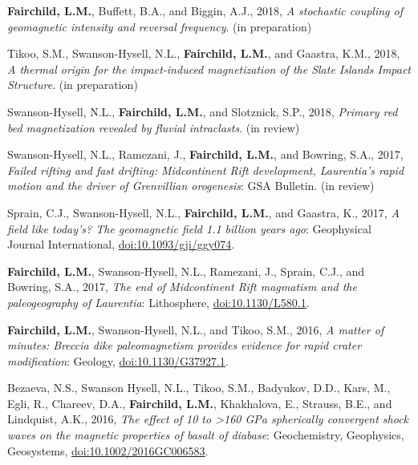 \documentclass[11pt,a4paper,sans]{moderncv}
\begin{document}
\begin{etaremune}[itemsep=3pt]

    \item \textbf{Fairchild, L.M.}, Buffett, B.A., and Biggin, A.J., 2018,
        \textit{A stochastic coupling of geomagnetic intensity and reversal
        frequency}. (in preparation)

    \item{Tikoo, S.M., Swanson-Hysell, N.L., \textbf{Fairchild, L.M.}, and
            Gaastra, K.M., 2018, \textit{A thermal origin for the impact-induced
            magnetization of the Slate Islands Impact Structure}. (in preparation)}

    \item{Swanson-Hysell, N.L., \textbf{Fairchild, L.M.}, and Slotznick, S.P.,
            2018, \textit{Primary red bed magnetization revealed by fluvial
        intraclasts}. (in review)}

    \item{Swanson-Hysell, N.L., Ramezani, J., \textbf{Fairchild, L.M.}, and
            Bowring, S.A., 2017, \textit{Failed rifting and fast drifting:
                Midcontinent Rift development, Laurentia's rapid motion and the
        driver of Grenvillian orogenesis}: GSA Bulletin. (in review)}

    \item{Sprain, C.J., Swanson-Hysell, N.L., \textbf{Fairchild, L.M.}, and
            Gaastra, K., 2017, \textit{A field like today's? The geomagnetic
            field 1.1 billion years ago}: Geophysical Journal International,
            {\color{cyan}\href{https://doi.org/10.1093/gji/ggy074}
        {doi:10.1093/gji/ggy074}}.}

    \item{\textbf{Fairchild, L.M.}, Swanson-Hysell, N.L., Ramezani, J., Sprain,
            C.J., and Bowring, S.A., 2017, \textit{The end of Midcontinent Rift
            magmatism and the paleogeography of Laurentia}: Lithosphere,
            {\color{cyan}\href{https://doi.org/10.1130/L580.1}
        {doi:10.1130/L580.1}}.}

    \item{\textbf{Fairchild, L.M.}, Swanson-Hysell, N.L., and Tikoo, S.M., 2016,
            \textit{A matter of minutes: Breccia dike paleomagnetism provides
            evidence for rapid crater modification}: Geology,
            {\color{cyan}\href{https://doi.org/10.1130/G37927.1}
        {doi:10.1130/G37927.1}}.}

    \item{Bezaeva, N.S., Swanson Hysell, N.L., Tikoo, S.M., Badyukov, D.D.,
            Kars, M., Egli, R., Chareev, D.A., \textbf{Fairchild, L.M.},
            Khakhalova, E., Strauss, B.E., and Lindquist, A.K., 2016,
            \textit{The effect of 10 to >160 GPa spherically convergent shock
            waves on the magnetic properties of basalt of diabase}:
            Geochemistry, Geophysics, Geosystems,
            {\color{cyan}\href{https://doi.org/10.1002/2016GC006583}
        {doi:10.1002/2016GC006583}}.}


\end{etaremune}
\end{document}
